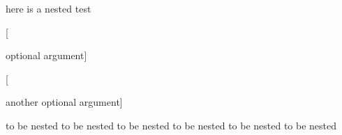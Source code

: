 here is a nested test
\begin{one}

	[

		optional argument]

	[

		another optional argument]

	to be nested to be nested
	to be nested to be nested
	to be nested to be nested
\end{one}
